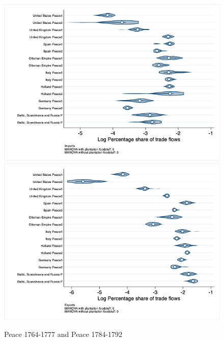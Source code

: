 \documentclass[12pt,a4paper,notitlepage,english]{article}
\begin{document}
\begin{appendix}
\begin{figure}[h!]
\centering
\caption{Peace 1764-1777 and Peace 1784-1792}
\label{seven_peace1764_1777_nat_distr_pays7}
\includegraphics[scale=.4]{peace1764_1777_peace1784_1792_nat_distr_Ipays7}
\includegraphics[scale=.4]{peace1764_1777_peace1784_1792_nat_distr_Xpays7}
\end{figure}


\end{appendix}
\end{document}
